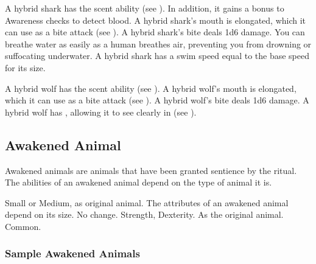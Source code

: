 
            \begin{itemize}
                 A hybrid shark has the scent ability (see ).
                    In addition, it gains a  bonus to Awareness checks to detect blood.
                 A hybrid shark's mouth is elongated, which it can use as a bite attack (see ).
                    A hybrid shark's bite deals 1d6 damage.
                 You can breathe water as easily as a human breathes air, preventing you from drowning or suffocating underwater.
                 A hybrid shark has a swim speed equal to the base speed for its size.
            \end{itemize}


            \begin{itemize}
                 A hybrid wolf has the scent ability (see ).
                 A hybrid wolf's mouth is elongated, which it can use as a bite attack (see ).
                    A hybrid wolf's bite deals 1d6 damage.
                 A hybrid wolf has , allowing it to see clearly in  (see ).
            \end{itemize}

    \subsection{Awakened Animal}

        Awakened animals are animals that have been granted sentience by the  ritual.
        The abilities of an awakened animal depend on the type of animal it is.

         Small or Medium, as original animal.
         The attributes of an awakened animal depend on its size.
         No change.
          Strength,  Dexterity.
         As the original animal.
         Common.

        \subsubsection{Sample Awakened Animals}

